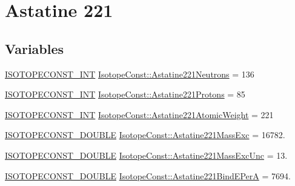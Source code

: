 \hypertarget{group___isotope_const-_astatine-_at221}{}\section{Astatine 221}
\label{group___isotope_const-_astatine-_at221}
\subsection*{Variables}
\begin{DoxyCompactItemize}
\item 
\mbox{\hyperlink{group___isotope_const-_macros_ga5f18360b3e99483a35c32d789e62621c}{I\+S\+O\+T\+O\+P\+E\+C\+O\+N\+S\+T\+\_\+\+I\+NT}} \mbox{\hyperlink{group___isotope_const-_astatine-_at221_ga47d304a62c094972e2210e4771fc72ee}{Isotope\+Const\+::\+Astatine221\+Neutrons}} = 136
\item 
\mbox{\hyperlink{group___isotope_const-_macros_ga5f18360b3e99483a35c32d789e62621c}{I\+S\+O\+T\+O\+P\+E\+C\+O\+N\+S\+T\+\_\+\+I\+NT}} \mbox{\hyperlink{group___isotope_const-_astatine-_at221_ga450fa29d4166e5ee16b0bbb7c3615f7c}{Isotope\+Const\+::\+Astatine221\+Protons}} = 85
\item 
\mbox{\hyperlink{group___isotope_const-_macros_ga5f18360b3e99483a35c32d789e62621c}{I\+S\+O\+T\+O\+P\+E\+C\+O\+N\+S\+T\+\_\+\+I\+NT}} \mbox{\hyperlink{group___isotope_const-_astatine-_at221_ga7865469d9987007f6b9b3aa79bedcbfa}{Isotope\+Const\+::\+Astatine221\+Atomic\+Weight}} = 221
\item 
\mbox{\hyperlink{group___isotope_const-_macros_ga8f45a7272ce02c0b4c65c44636ed719a}{I\+S\+O\+T\+O\+P\+E\+C\+O\+N\+S\+T\+\_\+\+D\+O\+U\+B\+LE}} \mbox{\hyperlink{group___isotope_const-_astatine-_at221_ga91d1c03a11d27aa676da653e9c28ed43}{Isotope\+Const\+::\+Astatine221\+Mass\+Exc}} = 16782.
\item 
\mbox{\hyperlink{group___isotope_const-_macros_ga8f45a7272ce02c0b4c65c44636ed719a}{I\+S\+O\+T\+O\+P\+E\+C\+O\+N\+S\+T\+\_\+\+D\+O\+U\+B\+LE}} \mbox{\hyperlink{group___isotope_const-_astatine-_at221_gada2b1c02d15a1a52696f23cc988a4fba}{Isotope\+Const\+::\+Astatine221\+Mass\+Exc\+Unc}} = 13.
\item 
\mbox{\hyperlink{group___isotope_const-_macros_ga8f45a7272ce02c0b4c65c44636ed719a}{I\+S\+O\+T\+O\+P\+E\+C\+O\+N\+S\+T\+\_\+\+D\+O\+U\+B\+LE}} \mbox{\hyperlink{group___isotope_const-_astatine-_at221_ga42c8932a5d744331c6c93c31ceb1fb90}{Isotope\+Const\+::\+Astatine221\+Bind\+E\+PerA}} = 7694.
\item 

\end{DoxyCompactItemize}
